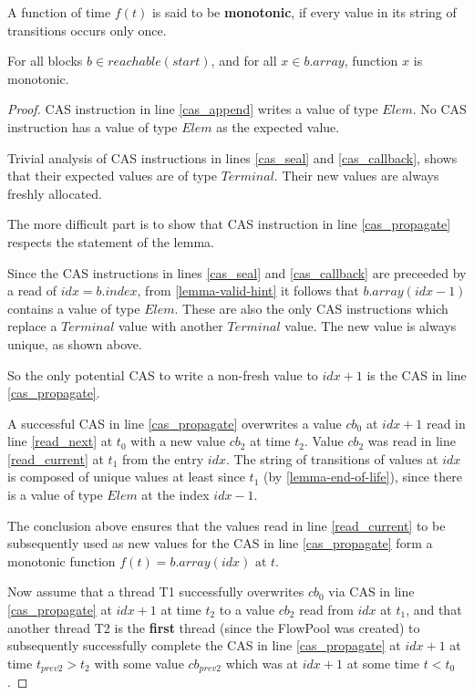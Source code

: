 \documentclass[runningheads,a4paper]{llncs}
\begin{document}
\begin{definition}[Monotonicity]
A function of time $f(t)$ is said to be \textbf{monotonic}, if every value in its string of transitions occurs only once.
\end{definition}


\begin{lemma}[Freshness]\label{lemma-freshness}
For all blocks $b \in reachable(start)$, and for all $x \in b.array$,
function $x$ is monotonic.
\end{lemma}

\begin{proof}
CAS instruction in line \ref{cas_append} writes a value of type
$Elem$. No CAS instruction has a value of type $Elem$ as the expected value.

Trivial analysis of CAS instructions in lines \ref{cas_seal} and
\ref{cas_callback}, shows that their expected values are of type
$Terminal$. Their new values are always freshly allocated.

The more difficult part is to show that CAS instruction in line
\ref{cas_propagate} respects the statement of the lemma.

Since the CAS instructions in lines \ref{cas_seal} and
\ref{cas_callback} are preceeded by a read of $idx = b.index$,
from \ref{lemma-valid-hint} it follows that $b.array(idx - 1)$ 
contains a value of type $Elem$.
These are also the only CAS instructions which replace a $Terminal$
value with another $Terminal$ value. The new value is always unique, as
shown above.

So the only potential CAS to write a non-fresh value to $idx + 1$ is the CAS
in line \ref{cas_propagate}.

A successful CAS in line \ref{cas_propagate} overwrites a value $cb_0$ at $idx + 1$
read in line \ref{read_next} at $t_0$ with a new value $cb_2$ at time $t_2$. Value $cb_2$ was
read in line \ref{read_current} at $t_1$ from the entry $idx$. The
string of transitions of values at $idx$ is composed of unique values
at least since $t_1$ (by \ref{lemma-end-of-life}), since there is
a value of type $Elem$ at the index $idx - 1$.

The conclusion above ensures that the values read in line \ref{read_current}
to be subsequently used as new values for the CAS in line \ref{cas_propagate}
form a monotonic function $f(t) = b.array(idx) \text{ at } t$.

Now assume that a thread T1 successfully overwrites $cb_0$
via CAS in line \ref{cas_propagate} at $idx + 1$ at time $t_2$ 
to a value $cb_2$ read from $idx$ at $t_1$, and that another thread T2 
is the \textbf{first} thread (since the FlowPool was created) to subsequently successfully
complete the CAS in line \ref{cas_propagate} at $idx + 1$ at time
$t_{prev2} > t_2$ with some value $cb_{prev2}$ which was at $idx + 1$ at some time
$t < t_0$.


\end{proof}
\end{document}
